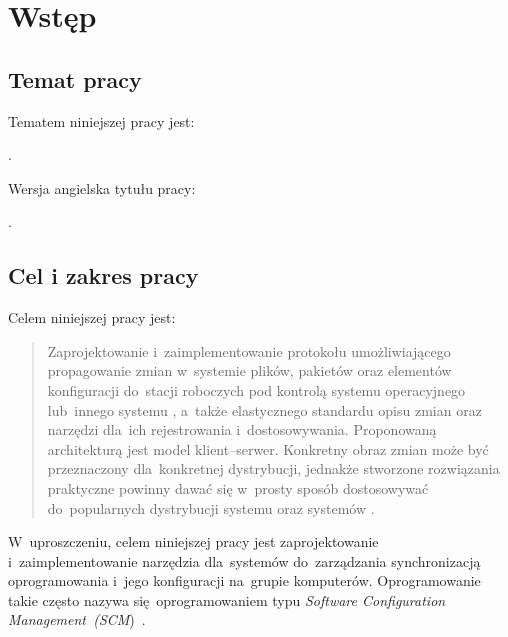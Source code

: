 \documentclass[thesis]{subfiles}
\makeatletter
\let\inserttitle\@title
\let\inserttitleaux\@titleaux
\makeatother
\begin{document}
\chapter{Wstęp}
\label{chapter:intro}


\section{Temat pracy}

\noindent Tematem niniejszej pracy jest:
\begin{displayquote}
\inserttitle.
\end{displayquote}
Wersja angielska tytułu pracy:
\begin{displayquote}
\inserttitleaux.
\end{displayquote}


\section{Cel i zakres pracy}
\label{cel-i-zakres}

\noindent Celem niniejszej pracy jest:
\blockcquote{formularz-zgloszenia-pracy}{Zaprojektowanie i~zaimplementowanie protokołu umożliwiającego propagowanie zmian w~systemie plików, pakietów oraz elementów konfiguracji do~stacji roboczych pod kontrolą systemu operacyjnego  lub~innego systemu , a~także elastycznego standardu opisu zmian oraz narzędzi dla~ich rejestrowania i~dostosowywania. Proponowaną architekturą jest model klient--serwer. Konkretny obraz zmian może być przeznaczony dla~konkretnej dystrybucji, jednakże stworzone rozwiązania praktyczne powinny dawać się w~prosty sposób dostosowywać do~popularnych dystrybucji systemu  oraz systemów .}
W~uproszczeniu, celem niniejszej pracy jest zaprojektowanie i~zaimplementowanie narzędzia dla~systemów  do~zarządzania synchronizacją oprogramowania i~jego konfiguracji na~grupie komputerów. Oprogramowanie takie często nazywa się~oprogramowaniem typu \emph{Software Configuration Management~(SCM})~\cite{wiki:scm}.

\end{document}
